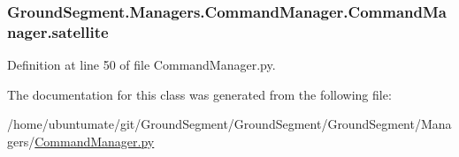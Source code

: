 \subsubsection[{satellite}]{\setlength{\rightskip}{0pt plus 5cm}Ground\+Segment.\+Managers.\+Command\+Manager.\+Command\+Manager.\+satellite}\label{class_ground_segment_1_1_managers_1_1_command_manager_1_1_command_manager_aabee387e15ec13296bda91fe638b7064}


Definition at line 50 of file Command\+Manager.\+py.



The documentation for this class was generated from the following file\+:\begin{DoxyCompactItemize}
\item 
/home/ubuntumate/git/\+Ground\+Segment/\+Ground\+Segment/\+Ground\+Segment/\+Managers/\hyperlink{_command_manager_8py}{Command\+Manager.\+py}\end{DoxyCompactItemize}
